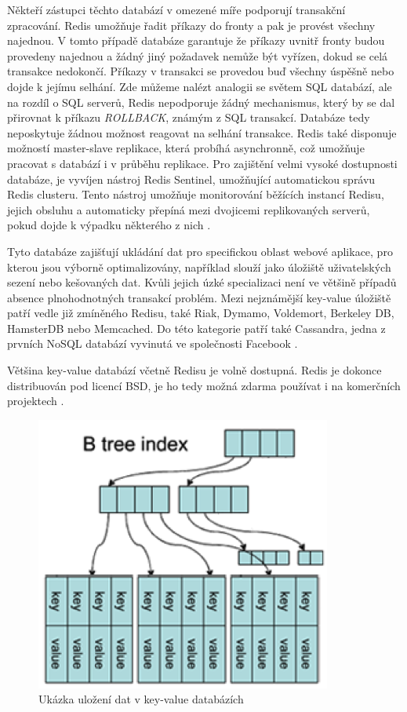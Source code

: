 Někteří zástupci těchto databází v omezené míře podporují transakční zpracování. Redis umožňuje řadit příkazy do fronty a pak je provést všechny najednou. V tomto případě databáze garantuje že příkazy uvnitř fronty budou provedeny najednou a žádný jiný požadavek nemůže být vyřízen, dokud se celá transakce nedokončí. Příkazy v transakci se provedou buď všechny úspěšně nebo dojde k jejímu selhání. Zde můžeme nalézt analogii se světem SQL databází, ale na rozdíl o SQL serverů, Redis nepodporuje žádný mechanismus, který by se dal přirovnat k příkazu \emph{ROLLBACK}, známým z SQL transakcí. Databáze tedy neposkytuje žádnou možnost reagovat na selhání transakce. Redis také disponuje možností master-slave replikace, která probíhá asynchronně, což umožňuje pracovat s databází i v průběhu replikace. Pro zajištění velmi vysoké dostupnosti databáze, je vyvíjen nástroj Redis Sentinel, umožňující automatickou správu Redis clusteru. Tento nástroj umožňuje monitorování běžících instancí Redisu, jejich obsluhu a automaticky přepíná mezi dvojicemi replikovaných serverů, pokud dojde k výpadku některého z nich \cite{redisDocs}.

Tyto databáze zajišťují ukládání dat pro specifickou oblast webové aplikace, pro kterou jsou výborně optimalizovány, například slouží jako úložiště uživatelských sezení nebo kešovaných dat. Kvůli jejich úzké specializaci není ve většině případů absence plnohodnotných transakcí problém. 
Mezi nejznámější key-value úložiště patří vedle již zmíněného Redisu, také Riak, Dymamo, Voldemort, Berkeley DB, HamsterDB nebo Memcached. 
Do této kategorie patří také Cassandra, jedna z prvních NoSQL databází vyvinutá ve společnosti Facebook \cite{cassandra}.

Většina key-value databází včetně Redisu je volně dostupná. Redis je dokonce distribuován pod licencí BSD, je ho tedy možná zdarma používat i na komerčních projektech \cite{redisDocs}.

\begin{figure}[h]
\begin{centering}
\includegraphics[scale=1]{obrazky/keyvaluedb-strom}
\par\end{centering}
\caption{Ukázka uložení dat v key-value databázích \cite{tolitStorelist} \label{fig:keyValueTree}}
\end{figure}

